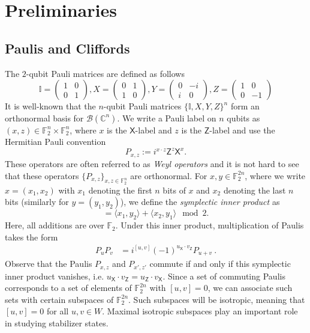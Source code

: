 \documentclass[11pt]{article}
\newcommand{\ra}{\rangle}
\newcommand{\la}{\langle}
\newcommand{\FF}{\mathbb{F}}
\newcommand{\id}{\ensuremath{\mathbb{I}}}
\newcommand{\Z}{\mathsf{Z}}
\newcommand{\X}{\mathsf{X}}
\newcommand{\F}{\mathbb{F}}
\begin{document}
\section{Preliminaries}



\subsection{Paulis and Cliffords} 
The $2$-qubit Pauli  matrices are defined as follows
$$\id=\begin{pmatrix}
1 & 0\\
0 & 1
\end{pmatrix}, X=\begin{pmatrix}
0 & 1\\
1 & 0
\end{pmatrix}, Y=\begin{pmatrix}
0 & -i\\
i & 0
\end{pmatrix},Z=\begin{pmatrix}
1 & 0\\
0 & -1
\end{pmatrix}
$$
It is well-known that the $n$-qubit Pauli matrices $\{\id,X,Y,Z\}^n$ form an  {orthonormal basis} for $\mathcal{B}(\mathbb{C}^n)$.  We write a Pauli label on $n$ qubits as
$(x,z)\in \F_2^n\times \F_2^n$, where $x$ is the $\X$-label and $z$ is the
$\Z$-label and use the Hermitian Pauli convention
$$
    P_{x,z}:=i^{x\cdot z} \Z^z\X^x.
$$
These operators are often referred to as \emph{Weyl operators} and it is not hard to see that  these operators $\{P_{x,z}\}_{x,z \in \FF_2^{n}}$ are orthonormal.  For $x,y \in \mathbb{F}_2^{2n}$, where we write $x=(x_1, x_2)$ with $x_1$ denoting the first $n$ bits of $x$ and $x_2$ denoting the last $n$ bits (similarly for $y=(y_1,y_2)$), we define the \emph{symplectic inner product} as
\begin{equation}
    [x,y] = \la x_1, y_2 \ra + \la x_2, y_1 \ra \mod 2.
    \label{eq:symplectic_inner_product}
\end{equation}
Here, all additions are over $\F_2$. Under this inner product, multiplication of Paulis takes the form
\begin{align}
    P_u P_v & = i^{[u,v]} (-1)^{u_\X \cdot v_\Z} P_{u+v}\ .
\end{align}
Observe that 
the Paulis $P_{x,z}$ and $P_{x',z'}$ commute if and only if this symplectic inner
product vanishes, i.e. $u_\X \cdot v_\Z = u_\Z \cdot v_\X$. Since a set of commuting Paulis corresponds to a set of elements of $\F_2^{2n}$ with $[u,v] = 0$, we can associate such sets with certain subspaces of $\F_2^{2n}$. Such subspaces will be isotropic, meaning that $[u,v] = 0$ for all $u,v \in W$. Maximal isotropic subspaces play an important role in studying stabilizer states.
\end{document}
